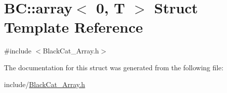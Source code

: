 \hypertarget{structBC_1_1array_3_010_00_01T_01_4}{}\section{BC\+:\+:array$<$ 0, T $>$ Struct Template Reference}
\label{structBC_1_1array_3_010_00_01T_01_4}


{\ttfamily \#include $<$Black\+Cat\+\_\+\+Array.\+h$>$}



The documentation for this struct was generated from the following file\+:\begin{DoxyCompactItemize}
\item 
include/\hyperlink{BlackCat__Array_8h}{Black\+Cat\+\_\+\+Array.\+h}\end{DoxyCompactItemize}
